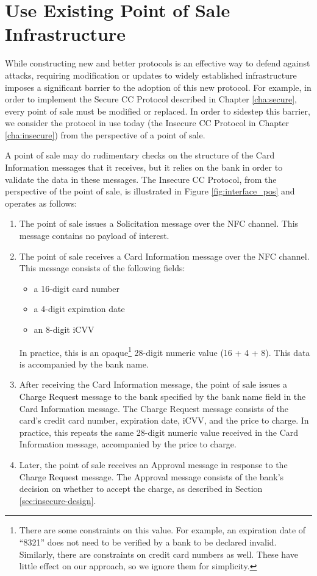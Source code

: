 \section{Use Existing Point of Sale Infrastructure}
\label{sec:goals-infrastructure}

While constructing new and better protocols is an effective way to defend against attacks,
	requiring modification or updates to widely established infrastructure imposes a significant barrier to the adoption of this new protocol.
For example, in order to implement the Secure CC Protocol described in Chapter \ref{cha:secure}, every point of sale must be modified or replaced.
In order to sidestep this barrier, we consider the protocol in use today (the Insecure CC Protocol in Chapter \ref{cha:insecure}) from the perspective of a point of sale.

A point of sale may do rudimentary checks on the structure of the Card Information messages that it receives,
	but it relies on the bank in order to validate the data in these messages.
The Insecure CC Protocol, from the perspective of the point of sale, is illustrated in Figure \ref{fig:interface_pos} and operates as follows:

\begin{enumerate}
\item The point of sale issues a Solicitation message over the NFC channel.
	This message contains no payload of interest.
\item The point of sale receives a Card Information message over the NFC channel.
	This message consists of the following fields:
	\begin{itemize}
	\item a 16-digit card number
	\item a 4-digit expiration date
	\item an 8-digit iCVV
	\end{itemize}
	In practice, this is an opaque\footnote{
        There are some constraints on this value.
        For example, an expiration date of ``8321'' does not need to be verified by a bank to be declared invalid.
        Similarly, there are constraints on credit card numbers as well.
        These have little effect on our approach, so we ignore them for simplicity.
    }
    28-digit numeric value (16 + 4 + 8).
    This data is accompanied by the bank name.
\item After receiving the Card Information message,
	the point of sale issues a Charge Request message to the bank specified by the bank name field in the Card Information message.
	The Charge Request message consists of the card's credit card number, expiration date, iCVV, and the price to charge.
	In practice, this repeats the same 28-digit numeric value received in the Card Information message, accompanied by the price to charge.
\item Later, the point of sale receives an Approval message in response to the Charge Request message.
	The Approval message consists of the bank's decision on whether to accept the charge, as described in Section \ref{sec:insecure-design}.
\end{enumerate}

